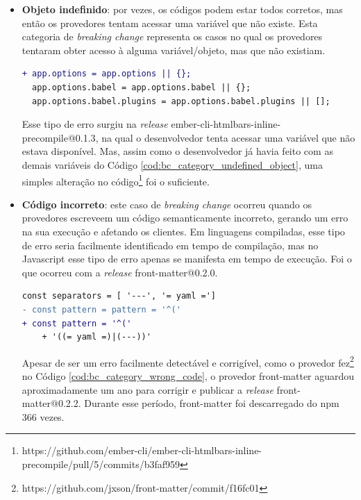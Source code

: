 \begin{itemize}
    \item \textbf{Objeto indefinido}: por vezes, os códigos podem estar todos corretos, mas então os provedores tentam acessar uma variável que não existe. Esta categoria de \textit{breaking change} representa os casos no qual os provedores tentaram obter acesso à alguma variável/objeto, mas que não existiam.

    \begin{lstlisting}[numbers=none, language=diff, label=cod:bc_category_undefined_object, caption={Exemplo da categoria de \textit{Objeto Indefinido}}]
+ app.options = app.options || {};
  app.options.babel = app.options.babel || {};
  app.options.babel.plugins = app.options.babel.plugins || [];
    \end{lstlisting}

    Esse tipo de erro surgiu na \textit{release} \textsf{ember-cli-htmlbars-inline-precompile@0.1.3}, na qual o desenvolvedor tenta acessar uma variável que não estava disponível. Mas, assim como o desenvolvedor já havia feito com as demais variáveis do Código \ref{cod:bc_category_undefined_object}, uma simples alteração no código\footnote{https://github.com/ember-cli/ember-cli-htmlbars-inline-precompile/pull/5/commits/b3faf959} foi o suficiente.

    \item \textbf{Código incorreto}: este caso de \textit{breaking change} ocorreu quando os provedores escreveem um código semanticamente incorreto, gerando um erro na sua execução e afetando os clientes. Em linguagens compiladas, esse tipo de erro seria facilmente identificado em tempo de compilação, mas no \textsf{Javascript} esse tipo de erro apenas se manifesta em tempo de execução. Foi o que ocorreu com a \textit{release} \textsf{front-matter@0.2.0}.

	 \begin{lstlisting}[numbers=none, language=diff, label=cod:bc_category_wrong_code, caption={Exemplo da categoria \textit{Código incorreto}}]
  const separators = [ '---', '= yaml =']
- const pattern = pattern = '^('
+ const pattern = '^('
    + '((= yaml =)|(---))'
	 \end{lstlisting}

    Apesar de ser um erro facilmente detectável e corrigível, como o provedor fez\footnote{https://github.com/jxson/front-matter/commit/f16fc01} no Código \ref{cod:bc_category_wrong_code}, o provedor \textsf{front-matter} aguardou aproximadamente um ano para corrigir e publicar a \textit{release} \textsf{front-matter@0.2.2}. Durante esse período, \textsf{front-matter} foi descarregado do \textsf{npm} 366 vezes.


\end{itemize}
